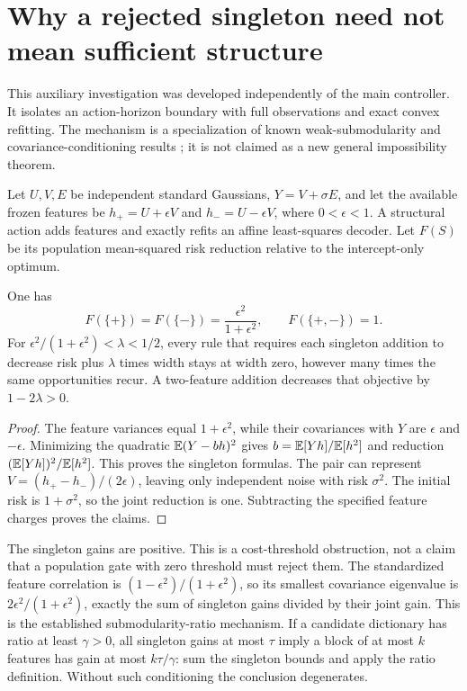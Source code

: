 \section{Why a rejected singleton need not mean sufficient structure}
\label{app:complementarity}
This auxiliary investigation was developed independently of the main
controller. It isolates an action-horizon boundary with full observations
and exact convex refitting. The mechanism is a specialization of known
weak-submodularity and covariance-conditioning results
\cite{das2011submodular,elenberg2018restricted}; it is not claimed as a new
general impossibility theorem.

Let $U,V,E$ be independent standard Gaussians, $Y=V+\sigma E$, and let the
available frozen features be $h_+=U+\epsilon V$ and $h_-=U-\epsilon V$,
where $0<\epsilon<1$. A structural action adds features and exactly refits
an affine least-squares decoder. Let $F(S)$ be its population mean-squared
risk reduction relative to the intercept-only optimum.
\begin{proposition}
One has
\[
 F(\{+\})=F(\{-\})=\frac{\epsilon^2}{1+\epsilon^2},\qquad
 F(\{+,-\})=1.
\]
For $\epsilon^2/(1+\epsilon^2)<\lambda<1/2$, every rule that requires each
singleton addition to decrease risk plus $\lambda$ times width stays at
width zero, however many times the same opportunities recur. A two-feature
addition decreases that objective by $1-2\lambda>0$.
\end{proposition}
\begin{proof}
The feature variances equal $1+\epsilon^2$, while their covariances with
$Y$ are $\epsilon$ and $-\epsilon$. Minimizing the quadratic
$\mathbb E(Y-bh)^2$ gives $b=\mathbb E[Yh]/\mathbb E[h^2]$ and reduction
$(\mathbb E[Yh])^2/\mathbb E[h^2]$. This proves the singleton formulas. The pair can
represent $V=(h_+-h_-)/(2\epsilon)$, leaving only independent noise with
risk $\sigma^2$. The initial risk is $1+\sigma^2$, so the joint reduction
is one. Subtracting the specified feature charges proves the claims.
\end{proof}
The singleton gains are positive. This is a cost-threshold obstruction,
not a claim that a population gate with zero threshold must reject them.
The standardized feature correlation is
$(1-\epsilon^2)/(1+\epsilon^2)$, so its smallest covariance eigenvalue is
$2\epsilon^2/(1+\epsilon^2)$, exactly the sum of singleton gains divided
by their joint gain. This is the established submodularity-ratio mechanism.
If a candidate dictionary has ratio at least $\gamma>0$, all singleton
gains at most $\tau$ imply a block of at most $k$ features has gain at most
$k\tau/\gamma$: sum the singleton bounds and apply the ratio definition.
Without such conditioning the conclusion degenerates.

